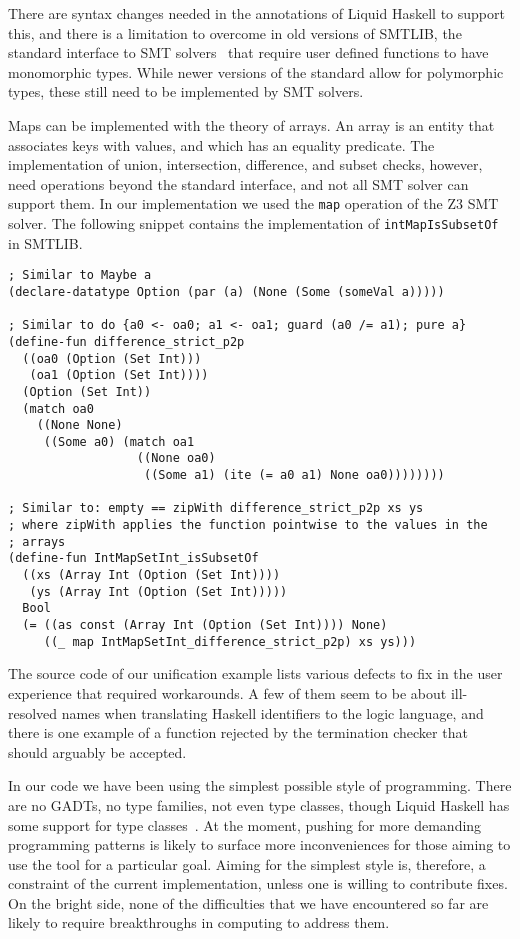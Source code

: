 \documentclass[acmtog, anonymous]{acmart}
\newcommand{\tc}[1]{{\small\texttt{#1}}}
\begin{document}
There are syntax changes needed in the annotations of Liquid Haskell to support
this, and there is a limitation to overcome in old versions of SMTLIB, the standard
interface to SMT solvers~\cite{BarFT-RR-25} that require user defined functions to
have monomorphic types. While newer versions of the standard allow for polymorphic
types, these still need to be implemented by SMT solvers.

Maps can be implemented with the theory of arrays. An array is an entity that
associates keys with values, and which has an equality predicate.
The implementation of union, intersection, difference, and subset checks, however,
need operations beyond the standard interface, and not all SMT solver can support
them. In our implementation we used the \tc{map} operation of the
Z3 SMT solver. The following snippet contains the implementation of
\tc{intMapIsSubsetOf} in SMTLIB.

\begin{verbatim}
; Similar to Maybe a
(declare-datatype Option (par (a) (None (Some (someVal a)))))

; Similar to do {a0 <- oa0; a1 <- oa1; guard (a0 /= a1); pure a}
(define-fun difference_strict_p2p
  ((oa0 (Option (Set Int)))
   (oa1 (Option (Set Int))))
  (Option (Set Int))
  (match oa0
    ((None None)
     ((Some a0) (match oa1
                  ((None oa0)
                   ((Some a1) (ite (= a0 a1) None oa0))))))))

; Similar to: empty == zipWith difference_strict_p2p xs ys
; where zipWith applies the function pointwise to the values in the
; arrays
(define-fun IntMapSetInt_isSubsetOf
  ((xs (Array Int (Option (Set Int))))
   (ys (Array Int (Option (Set Int)))))
  Bool
  (= ((as const (Array Int (Option (Set Int)))) None)
     ((_ map IntMapSetInt_difference_strict_p2p) xs ys)))
\end{verbatim}

The source code of our unification example lists various defects to fix
in the user experience that required workarounds. A few of them seem to
be about ill-resolved names when translating Haskell identifiers to the
logic language, and there is one example of a function rejected by the
termination checker that should arguably be accepted.

In our code we have been using the simplest possible style of programming.
There are no GADTs, no type families, not even type classes, though
Liquid Haskell has some support for type classes~\cite{liu20}. At the moment,
pushing for more demanding programming patterns is likely to surface more
inconveniences for those aiming to use the tool for a particular goal.
Aiming for the simplest style is, therefore, a constraint of the current
implementation, unless one is willing to contribute fixes. On the bright
side, none of the difficulties that we have encountered so far are likely to
require breakthroughs in computing to address them.
\end{document}
